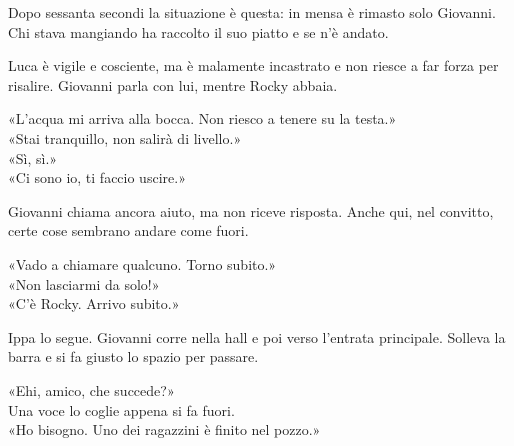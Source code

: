 \par\medskip
Dopo sessanta secondi la situazione \`e questa: in mensa \`e rimasto solo Giovanni.
Chi stava mangiando ha raccolto il suo piatto e se n’\`e andato.

\par\medskip
Luca \`e vigile e cosciente, ma \`e malamente incastrato e non riesce a far forza per risalire.
Giovanni parla con lui, mentre Rocky abbaia.

\par\medskip
«L'acqua mi arriva alla bocca. Non riesco a tenere su la testa.»\\
«Stai tranquillo, non salirà di livello.»\\
«Sì, sì.»\\
«Ci sono io, ti faccio uscire.»
\par\medskip
Giovanni chiama ancora aiuto, ma non riceve risposta. Anche qui, nel convitto, certe cose sembrano andare come fuori.

\par\medskip
«Vado a chiamare qualcuno. Torno subito.»\\
«Non lasciarmi da solo!»\\
«C’\`e Rocky. Arrivo subito.»

\par\medskip
Ippa lo segue. Giovanni corre nella hall e poi verso l’entrata principale.
Solleva la barra e si fa giusto lo spazio per passare.

\par\medskip
«Ehi, amico, che succede?»\\
Una voce lo coglie appena si fa fuori.\\
«Ho bisogno. Uno dei ragazzini \`e finito nel pozzo.»
